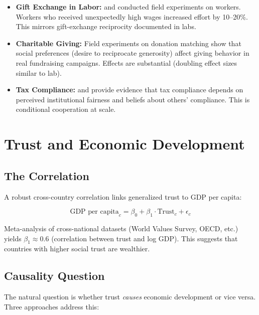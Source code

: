 \documentclass[12pt,oneside]{book}
\begin{document}
\begin{itemize}
  \item \textbf{Gift Exchange in Labor:} \citet{gneezyrustichini2000} and \citet{fehretal2009}
        conducted field experiments on workers. Workers who received unexpectedly high wages
        increased effort by 10--20\%. This mirrors gift-exchange reciprocity documented in labs.

  \item \textbf{Charitable Giving:} Field experiments on donation matching \citep{karlanlist2007}
        show that social preferences (desire to reciprocate generosity) affect giving behavior
        in real fundraising campaigns. Effects are substantial (doubling effect sizes similar to lab).

  \item \textbf{Tax Compliance:} \citet{scholzleyden2005} and \citet{posner2000} provide evidence
        that tax compliance depends on perceived institutional fairness and beliefs about others'
        compliance. This is conditional cooperation at scale.
\end{itemize}

\section{Trust and Economic Development}

\subsection{The Correlation}

A robust cross-country correlation links generalized trust to GDP per capita:

\begin{equation}
\text{GDP per capita}_c = \beta_0 + \beta_1 \cdot \text{Trust}_c + \epsilon_c
\label{eq:trust-gdp}
\end{equation}

Meta-analysis of cross-national datasets (World Values Survey, OECD, etc.) yields
$\beta_1 \approx 0.6$ (correlation between trust and log GDP). This suggests that countries
with higher social trust are wealthier.

\subsection{Causality Question}

The natural question is whether trust \emph{causes} economic development or vice versa. Three
approaches address this:
\end{document}
